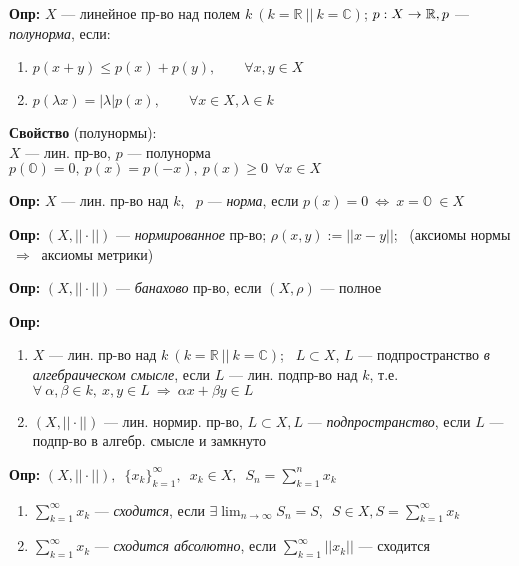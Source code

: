 \documentclass[12pt, letterpaper, twoside]{article}
\begin{document}
\noindent
\textbf{Опр:} \(X\) --- линейное пр-во над полем \(k \ (k = \mathbb{R} \ || \ k = \mathbb{C})\); \enspace \(p: X \rightarrow \mathbb{R}, \\ p\) --- \textit{полунорма}, если:
\begin{enumerate}
    \item \(p(x + y) \leq p(x) + p(y), \qquad \forall x, y \in X\)
    \item \(p(\lambda x) = |\lambda| p(x), \qquad \forall x \in X, \lambda \in k \)
\end{enumerate}

\vspace*{0.3cm}
\noindent
\textbf{Свойство} (полунормы): \\
\(X\) --- лин. пр-во, \(p\) --- полунорма \ \Rightarrow \ \(p(\mathbb{O}) = 0, \ p(x) = p(-x), \ p(x) \geq 0 \enspace \forall x \in X\)

\vspace*{0.3cm}
\noindent
\textbf{Опр:} \(X\) --- лин. пр-во над \(k\), \ \(p\) --- \textit{норма}, если \(p(x) = 0 \ \Leftrightarrow \ x = \mathbb{O} \ \in X \)

\vspace*{0.3cm}
\noindent
\textbf{Опр:} \( (X, || \cdot ||) \) --- \textit{нормированное} пр-во; \(\rho(x, y) := ||x - y||\); \ (аксиомы нормы \( \ \Rightarrow \ \) аксиомы метрики)

\vspace*{0.3cm}
\noindent
\textbf{Опр:} \( (X, || \cdot ||) \) --- \textit{банахово} пр-во, если \( (X, \rho) \) --- полное

\vspace*{0.3cm}
\noindent
\textbf{Опр:} 
\begin{enumerate}
    \item \(X\) --- лин. пр-во над \(k \ (k = \mathbb{R} \ || \ k = \mathbb{C})\); \ \(L \subset X\), \(L\) --- подпространство \textit{в алгебраическом смысле}, если \(L\) --- лин. подпр-во над \(k\), т.е. \( \forall \ \alpha, \beta \in k, \ x, y \in L \ \Rightarrow \ \alpha x + \beta y \in L \)
    \item \( (X, || \cdot ||) \) --- лин. нормир. пр-во, \( L \subset X, L \) --- \textit{подпространство}, если \(L\) --- подпр-во в алгебр. смысле и замкнуто 
\end{enumerate}

\vspace*{0.3cm}
\noindent
\textbf{Опр:} \( (X, || \cdot ||), \enspace \{x_k\}^{\infty}_{k = 1}, \enspace x_k \in X, \enspace S_n = \sum_{k=1}^n x_k \)
\vspace*{0.1cm}
\begin{enumerate}
    \item \( \sum_{k=1}^\infty x_k \) --- \textit{сходится}, если \( \exists \lim_{n \rightarrow \infty} S_n = S, \enspace S \in X, S = \sum_{k=1}^\infty x_k \)
    \vspace*{0.1cm}
    \item \( \sum_{k=1}^\infty x_k \) --- \textit{сходится абсолютно}, если \( \sum_{k=1}^\infty ||x_k|| \) --- сходится
\end{enumerate}
\end{document}

